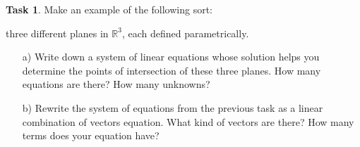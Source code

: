 \documentclass{tufte-book}
\theoremstyle{definition}
\newtheorem{task}{Task}
\begin{document}
\begin{task}
Make an example of the following sort:
\begin{compactitem}
\item three different planes in $\mathbb{R}^3$, each defined parametrically.
\end{compactitem}
\begin{enumerate}
\item[a)] Write down a system of linear equations whose solution helps you determine the points of intersection of these three planes. How many equations are there? How many unknowns?

\item[b)] Rewrite the system of equations from the previous task as a linear combination of vectors equation. What kind of vectors are there? How many terms does your equation have?
\end{enumerate}
\end{task}




%
%
\end{document}
